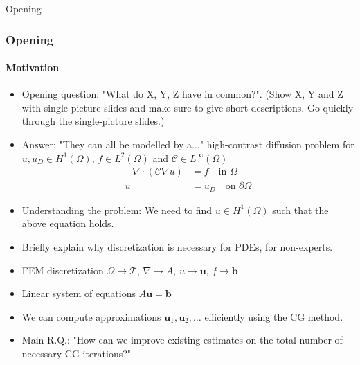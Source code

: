 \begin{frame}[label=opening]{Opening}
    \frametitle{Opening}
    \framesubtitle{Motivation}
        \begin{itemize}
            \item<1-> Opening question: "What do X, Y, Z have in common?". (Show X, Y and Z with single picture slides and make sure to give short descriptions. Go quickly through the single-picture slides.)
            \item<2-> Answer: "They can all be modelled by a..." high-contrast diffusion problem for $u, u_D \in H^1(\Omega)$, $f\in L^2(\Omega)$ and $\mathcal{C}\in L^{\infty}(\Omega)$
                  \begin{equation*}
                      \begin{aligned}
                          -\nabla\cdot\left(\mathcal{C}\nabla u\right) & = f \quad \text{in } \Omega           \\
                          u                                            & = u_D \quad \text{on } \partial\Omega
                      \end{aligned}
                  \end{equation*}
            \item<3-> Understanding the problem: We need to find $u \in H^1(\Omega)$ such that the above equation holds.
            \item<4-> Briefly explain why discretization is necessary for PDEs, for non-experts.
            \item<5-> FEM discretization $\Omega\rightarrow\mathcal{T}$, $\nabla \rightarrow A$, $u\rightarrow\mathbf{u}$, $f\rightarrow\mathbf{b}$
            \item<6-> Linear system of equations $A\mathbf{u}=\mathbf{b}$
            \item<7-> We can compute approximations $\mathbf{u}_1, \mathbf{u}_2, \ldots$ efficiently using the CG method.
            \item<8-> Main R.Q.: "How can we improve existing estimates on the total number of necessary CG iterations?"
        \end{itemize}
\end{frame}